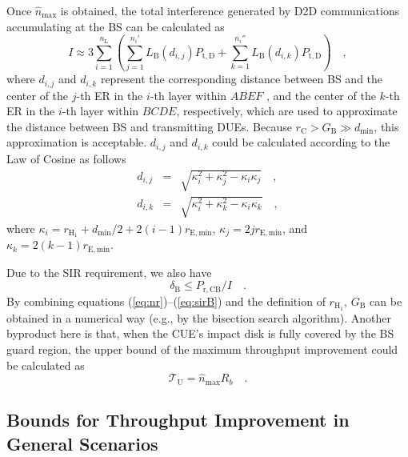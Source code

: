 \documentclass[journal, 10pt]{IEEEtran}
\begin{document}
Once $ \widehat{n}_{{\max}}$ is obtained, the total interference generated 
by D2D communications accumulating at the BS can be calculated as
\begin{equation}\label{eq:I}
I \approx 3 \sum_{i=1}^{n_\mathrm{L}} \left( 
\sum_{j=1}^{n_i'} L_\mathrm{B}(d_{i,j}) P_\mathrm{t,D}   
+ \sum_{k=1}^{n_i''} L_\mathrm{B}(d_{i,k}) P_\mathrm{t,D} \right)\quad, 
\end{equation}
where $d_{i,j}$ and $d_{i,k}$ represent the corresponding distance between 
BS and the center of the $j$-th ER in the $i$-th layer within $ABEF$
, and the center of the $k$-th ER in the $i$-th layer within $BCDE$, 
respectively, which are used to approximate the distance between BS 
and transmitting DUEs. Because $r_\mathrm{C} > G_{\mathrm{B}} \gg d_{\min}$, 
this approximation is acceptable. $d_{i,j}$ and $d_{i,k}$ could be calculated 
according to the Law of Cosine as follows
\setlength{\arraycolsep}{0.14em}
\begin{eqnarray}
d_{i,j} &=& \sqrt{ \kappa_i^2 + \kappa_j^2 - \kappa_i \kappa_j }\quad, \label{eq:dij}\\
d_{i,k} &=& \sqrt{ \kappa_i^2 + \kappa_k^2 - \kappa_i \kappa_k }\quad,\label{eq:dik}
\end{eqnarray}
where 
$\kappa_i = r_\mathrm{H_1} + d_{\min}/2 + 2(i-1)r_\mathrm{E, min}$, 
$\kappa_j = 2 j r_\mathrm{E, min}$, and
$\kappa_k = 2(k-1)r_\mathrm{E, min}$.

Due to the SIR requirement, we also have
\begin{equation}\label{eq:sirB}
\delta_\mathrm{B} \leq P_\mathrm{r, CB} / I \quad.
\end{equation}
By combining equations (\ref{eq:nr})--(\ref{eq:sirB}) and the definition 
of $r_{\mathrm{H}_1}$, $G_\mathrm{B}$ can be obtained in a numerical way 
(e.g., by the bisection search algorithm). Another byproduct here is that, 
when the CUE's impact disk is fully covered by the BS guard region, the 
upper bound of the maximum throughput improvement could be calculated as 
\begin{equation}
\mathcal{T}_\mathrm{U} =  \widehat{n}_\mathrm{max} R_b\quad. \label{eq:upper1}
\end{equation}


\subsection{Bounds for Throughput Improvement in General Scenarios}
\label{sec:general bounds}
\end{document}

